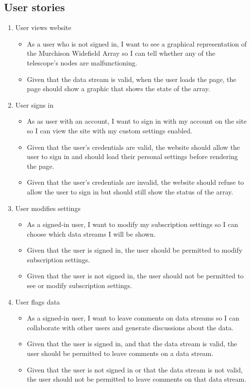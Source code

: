 \documentclass[12pt]{article}
\begin{document}
\begin{spacing}{1.5}
\subsection{User stories}
\begin{enumerate}
\item User views website
	\begin{itemize}
		\item As a user who is not signed in, I want to see a graphical representation of the Murchison Widefield Array so I can tell whether any of the telescope's nodes are malfunctioning.
		\item Given that the data stream is valid, when the user loads the page, the page should show a graphic that shows the state of the array.
	\end{itemize}
\item User signs in
	\begin{itemize}
        		\item As as user with an account, I want to sign in with my account on the site so I can view the site with my custom settings enabled.
        		\item Given that the user's credentials are valid, the website should allow the user to sign in and should load their personal settings before rendering the page.
		\item Given that the user's credentials are invalid, the website should refuse to allow the user to sign in but should still show the status of the array.
	\end{itemize}
\item User modifies settings
	\begin{itemize}
		\item As a signed-in user, I want to modify my subscription settings so I can choose which data streams I will be shown.
		\item Given that the user is signed in, the user should be permitted to modify subscription settings.
		\item Given that the user is not signed in, the user should not be permitted to see or modify subscription settings.
	\end{itemize}
\item User flags data
	\begin{itemize}
		\item As a signed-in user, I want to leave comments on data streams so I can collaborate with other users and generate discussions about the data.
		\item Given that the user is signed in, and that the data stream is valid, the user should be permitted to leave comments on a data stream.
		\item Given that the user is not signed in or that the data stream is not valid, the user should not be permitted to leave comments on that data stream.
	\end{itemize}
\end{enumerate}


\end{spacing}
\end{document}
